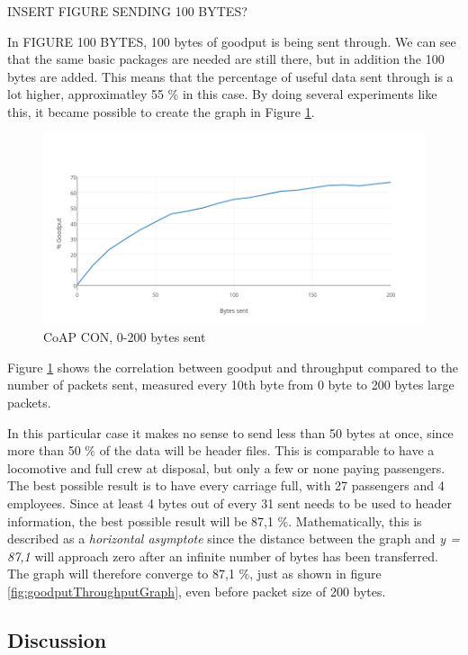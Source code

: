 INSERT FIGURE SENDING 100 BYTES? 

In FIGURE 100 BYTES, 100 bytes of goodput is being sent through. We can see that the same basic packages are needed are still there, but in addition the 100 bytes are added. This means that the percentage of useful data sent through is a lot higher, approximatley 55 \% in this case. By doing several experiments like this, it became possible to create the graph in 
Figure \ref{fig:coapCON0200}.


\begin{figure}[ht]
    \centering
    \includegraphics[scale=0.45]{CoAP_CONgraph2.png}    
    \caption{CoAP CON, 0-200 bytes sent}
    \label{fig:coapCON0200}
\end{figure}

Figure \ref{fig:coapCON0200} shows the correlation between goodput and throughput compared to the number of packets sent, measured every 10th byte from 0 byte to 200 bytes large packets.

In this particular case it makes no sense to send less than 50 bytes at once, since more than 50 \% of the data will be header files. This is comparable to have a locomotive and full crew at disposal, but only a few or none paying passengers. The best possible result is to have every carriage full, with 27 passengers and 4 employees. Since at least 4 bytes out of every 31 sent needs to be used to header information, the best possible result will be 87,1 \%. Mathematically, this is described as a \textit{horizontal asymptote} since the distance between the graph and \textit{y = 87,1} will approach zero after an infinite number of bytes has been transferred. The graph will therefore converge to 87,1 \%, just as shown in figure \ref{fig:goodputThroughputGraph}, even before packet size of 200 bytes.  

\subsection{Discussion}

